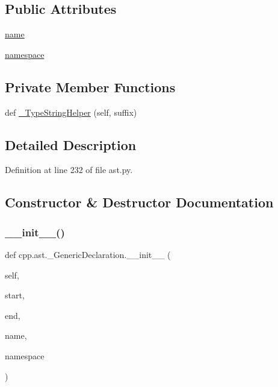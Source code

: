 \subsection*{Public Attributes}
\begin{DoxyCompactItemize}
\item 
\hyperlink{classcpp_1_1ast_1_1__GenericDeclaration_af774f4729dfd78d0538a6782fe8514c1}{name}
\item 
\hyperlink{classcpp_1_1ast_1_1__GenericDeclaration_a8aee3f11b37449d54b42a78e0a689f46}{namespace}
\end{DoxyCompactItemize}
\subsection*{Private Member Functions}
\begin{DoxyCompactItemize}
\item 
def \hyperlink{classcpp_1_1ast_1_1__GenericDeclaration_a2ab2d07ccfa5d51ed153e82004c49e98}{\+\_\+\+Type\+String\+Helper} (self, suffix)
\end{DoxyCompactItemize}


\subsection{Detailed Description}


Definition at line 232 of file ast.\+py.



\subsection{Constructor \& Destructor Documentation}
\mbox{\label{classcpp_1_1ast_1_1__GenericDeclaration_afde72751e20708a7802eb7707d23bc3c}} 
\subsubsection{\texorpdfstring{\+\_\+\+\_\+init\+\_\+\+\_\+()}{\_\_init\_\_()}}
{\footnotesize\ttfamily def cpp.\+ast.\+\_\+\+Generic\+Declaration.\+\_\+\+\_\+init\+\_\+\+\_\+ (\begin{DoxyParamCaption}\item[{}]{self,  }\item[{}]{start,  }\item[{}]{end,  }\item[{}]{name,  }\item[{}]{namespace }\end{DoxyParamCaption})}



